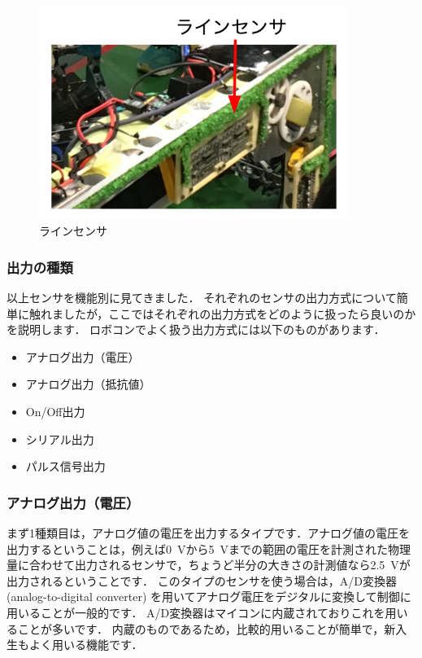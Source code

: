 \begin{figure}[h]
  \centering
  \includegraphics[width=10cm]{circuit/fig/linesensor.png}
  \caption{ラインセンサ}
  \label{fig:circuit_linesensor}
\end{figure}

\subsubsection{出力の種類}

以上センサを機能別に見てきました．
それぞれのセンサの出力方式について簡単に触れましたが，ここではそれぞれの出力方式をどのように扱ったら良いのかを説明します．
ロボコンでよく扱う出力方式には以下のものがあります．

\begin{itemize}
    \item アナログ出力（電圧）
    \item アナログ出力（抵抗値）
    \item On/Off出力
    \item シリアル出力
    \item パルス信号出力
\end{itemize}

\subsubsection{アナログ出力（電圧）}

まず1種類目は，アナログ値の電圧を出力するタイプです．アナログ値の電圧を出力するということは，例えば\SI{0}{V}から\SI{5}{V}までの範囲の電圧を計測された物理量に合わせて出力されるセンサで，ちょうど半分の大きさの計測値なら\SI{2.5}{V}が出力されるということです．
このタイプのセンサを使う場合は，A/D変換器 (analog-to-digital converter) を用いてアナログ電圧をデジタルに変換して制御に用いることが一般的です．
A/D変換器はマイコンに内蔵されておりこれを用いることが多いです．
内蔵のものであるため，比較的用いることが簡単で，新入生もよく用いる機能です．

